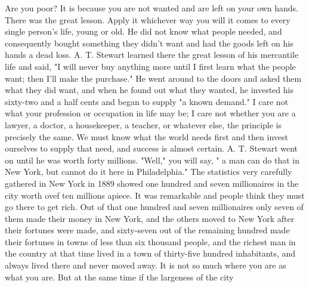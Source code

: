 \documentclass[10pt]{article}
\begin{document}
Are you poor? It is because you are not wanted and are left on your own hands. There was the great lesson. Apply it whichever way you will it comes to every single person's life, young or old. He did not know what people needed, and consequently bought something they didn't want and had the goods left on his hands a dead loss. A. T. Stewart learned there the great lesson of his mercantile life and said, "I will never buy anything more until I first learn what the people want; then I'll make the purchase." He went around to the doors and asked them what they did want, and when he found out what they wanted, he invested his sixty-two and a half cents and began to supply "a known demand." I care not what your profession or occupation in life may be; I care not whether you are a lawyer, a doctor, a housekeeper, a teacher, or whatever else, the principle is precisely the same. We must know what the world needs first and then invest ourselves to supply that need, and success is almost certain. A. T. Stewart went on until he was worth forty millions. "Well," you will say, " a man can do that in New York, but cannot do it here in Philadelphia." The statistics very carefully gathered in New York in 1889 showed one hundred and seven millionaires in the city worth ovef ten millions apiece. It was remarkable and people think they must go there to get rich. Out of that one hundred and seven millionaires only seven of them made their money in New York, and the others moved to New York after their fortunes were made, and sixty-seven out of the remaining hundred made their fortunes in towns of less than six thousand people, and the richest man in the country at that time lived in a town of thirty-five hundred inhabitants, and always lived there and never moved away. It is not so much where you are as what you are. But at the same time if the largeness of the city\\
\end{document}
